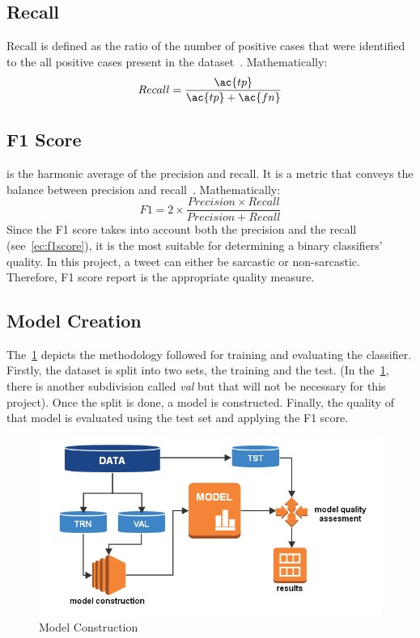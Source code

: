 \subsection{Recall}
Recall is defined as the ratio of the number of positive cases that were identified to the all positive cases present in the dataset~\cite{f1score}. Mathematically:
\begin{equation}
Recall = \frac{\ac{tp}}{\ac{tp}+\ac{fn}}
\label{ec:recall}
\end{equation}
\subsection{F1 Score}
is the harmonic average of the precision and recall. It is a metric that conveys the balance between precision and recall~\cite{f1score}. Mathematically:
\begin{equation}
F1 = 2\times \frac{Precision \times Recall}{Precision + Recall}
\label{ec:f1score}
\end{equation}
Since the F1 score takes into account both the precision and the recall (see~\cref{ec:f1score}), it is the most suitable for determining a binary classifiers' quality. In this project, a tweet can either be sarcastic or non-sarcastic. Therefore, F1 score report is the appropriate quality measure.
\subsection{Model Creation}
\label{sec:modcons}
The~\cref{fig:modcons} depicts the methodology followed for training and evaluating the classifier. Firstly, the dataset is split into two sets, the training and the test. (In the~\cref{fig:modcons}, there is another subdivision called \textit{val} but that will not be necessary for this project). Once the split is done, a model is constructed. Finally, the quality of that model is evaluated using the test set and applying the F1 score.
\begin{figure}
	\includegraphics[width=\linewidth]{img/model_construction.png}
	\caption{Model Construction~\cite{modcons}}
	\label{fig:modcons}
\end{figure}
